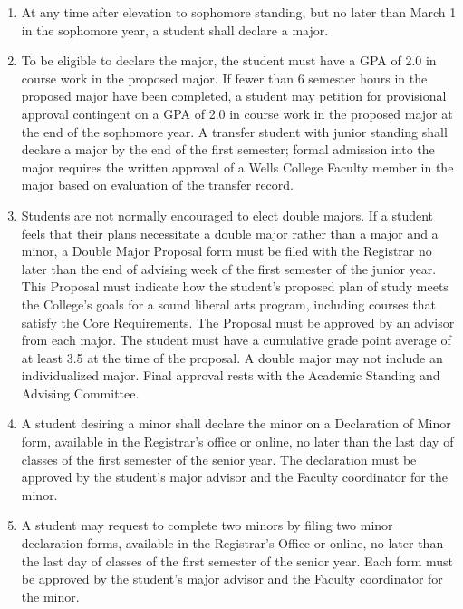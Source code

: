 \documentclass{manual}
\newcommand{\modified}[1]{}
\newcommand{\itemLevelA}{\alph*.}
\newcommand{\itemRefA}{\alph*}
\begin{document}
\begin{enumerate}[label=\itemLevelA,ref=\itemRefA]
\item At any time after elevation to sophomore standing, but no later than\modified{11/12/01} March 1 in the sophomore year, a student shall declare a major.

\item To be eligible to declare the major, the student must have a GPA of 2.0\modified{5/13/93} in course work in the proposed major. If fewer than 6 semester hours in the proposed major have been completed, a student may petition for provisional approval contingent on a GPA of 2.0 in course work in the proposed major at the end of the sophomore year. A transfer student with junior standing shall declare a major by the end of the first semester; formal admission into the major requires the written approval of a Wells College Faculty member in the major based on evaluation of the transfer record.

\item Students are not normally encouraged to elect double majors. If a student \modified{10/17/00} feels that their plans necessitate a double major rather than a major and a minor,  a Double Major Proposal form must be filed with the Registrar no later than the \modified{9/9/2003}
end of advising week of the first semester of the junior year. This Proposal must indicate how the student's proposed plan of study meets the College's goals for a sound liberal arts program, including courses that satisfy the Core Requirements. The Proposal must be approved by an advisor from each major. The student must have a cumulative grade point average of at least 3.5 at the time of the proposal. A double major may not include an individualized major. Final approval rests with the Academic Standing and Advising Committee.

\item A student desiring a minor shall declare the minor on a Declaration of Minor\modified{4/8/03} form, available in the Registrar's office or online, no later than\modified{5/08/12} the last day of classes of the first semester of the senior year. The declaration must be approved by the student's major advisor and the Faculty coordinator for the minor.

\item A student may request to complete two minors by filing two minor declaration forms, available in the Registrar's Office or online, no later than the last day of classes of the first semester of the senior year. Each form must be approved by the student's major advisor and the Faculty coordinator for the minor.
\end{enumerate}
\end{document}
